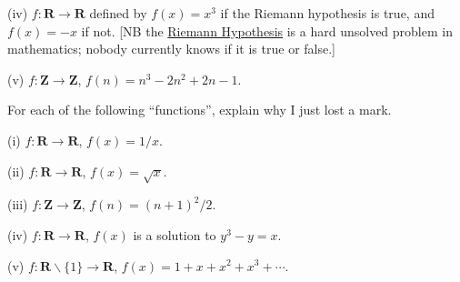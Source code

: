 \documentclass[10pt]{article}
\newcommand{\R}{\mathbf{R}}
\newcommand{\Z}{\mathbf{Z}}
\begin{document}
(iv) $f:\R\to\R$ defined by $f(x)=x^3$ if the Riemann hypothesis is true, and $f(x)=-x$ if not. [NB the \href{https://en.wikipedia.org/wiki/Riemann_hypothesis}{Riemann Hypothesis} is a hard unsolved problem in mathematics; nobody currently knows if it is true or false.]

(v) $f:\Z\to\Z$, $f(n)=n^3-2n^2+2n-1$.

\medskip{} For each of the following ``functions'', explain why I just lost a mark.

(i) $f:\R\to\R$, $f(x)=1/x$.

(ii) $f:\R\to\R$, $f(x)=\sqrt{x}$. 

(iii) $f:\Z\to\Z$, $f(n)=(n+1)^2/2$.

(iv) $f:\R\to\R$, $f(x)$ is a solution to $y^3-y=x$.

(v) $f:\R\backslash\{1\}\to\R$, $f(x)=1+x+x^2+x^3+\cdots$.
\end{document}
